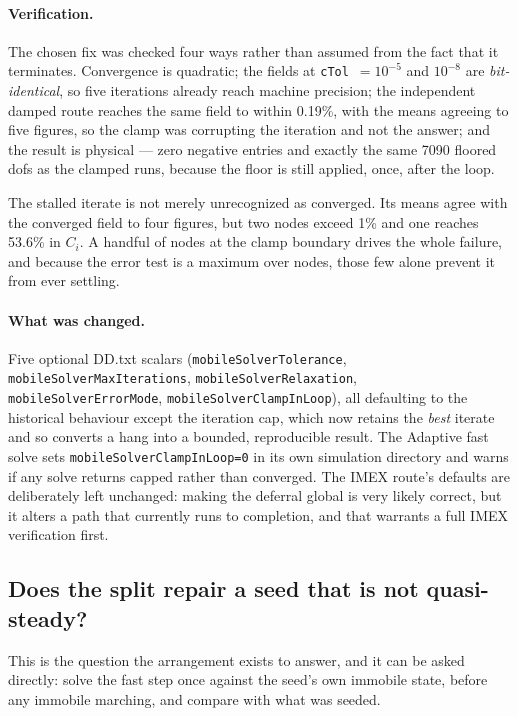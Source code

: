 \documentclass[11pt,a4paper]{article}
\newcommand{\code}[1]{\texttt{\small #1}}
\begin{document}
\paragraph{Verification.} The chosen fix was checked four ways rather than
assumed from the fact that it terminates. Convergence is quadratic; the fields
at \code{cTol}~$=10^{-5}$ and $10^{-8}$ are \emph{bit-identical}, so five
iterations already reach machine precision; the independent damped route reaches
the same field to within 0.19\%, with the means agreeing to five figures, so the
clamp was corrupting the iteration and not the answer; and the result is
physical --- zero negative entries and exactly the same 7090 floored dofs as the
clamped runs, because the floor is still applied, once, after the loop.

The stalled iterate is not merely unrecognized as converged. Its means agree with
the converged field to four figures, but two nodes exceed 1\% and one reaches
53.6\% in $C_i$. A handful of nodes at the clamp boundary drives the whole
failure, and because the error test is a maximum over nodes, those few alone
prevent it from ever settling.

\paragraph{What was changed.} Five optional DD.txt scalars
(\code{mobileSolverTolerance}, \code{mobileSolverMaxIterations},
\code{mobileSolverRelaxation}, \code{mobileSolverErrorMode},
\code{mobileSolverClampInLoop}), all defaulting to the historical behaviour
except the iteration cap, which now retains the \emph{best} iterate and so
converts a hang into a bounded, reproducible result. The Adaptive fast solve sets
\code{mobileSolverClampInLoop=0} in its own simulation directory and warns if any
solve returns capped rather than converged. The IMEX route's defaults are
deliberately left unchanged: making the deferral global is very likely correct,
but it alters a path that currently runs to completion, and that warrants a full
IMEX verification first.

\subsection{Does the split repair a seed that is not quasi-steady?}
\label{sec:seedrelax}

This is the question the arrangement exists to answer, and it can be asked
directly: solve the fast step once against the seed's own immobile state, before
any immobile marching, and compare with what was seeded.
\end{document}
